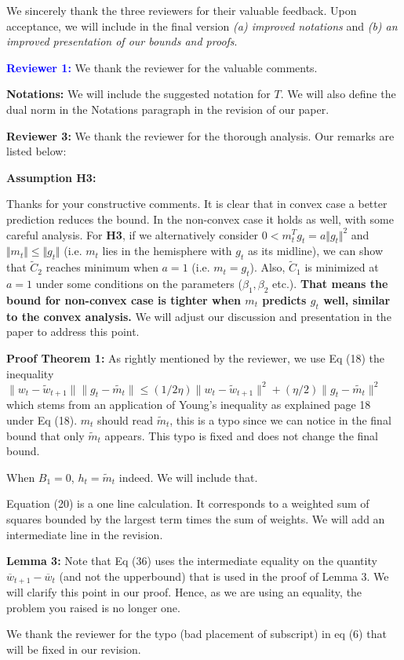 \documentclass{article}
\begin{document}
We sincerely thank the three reviewers for their valuable feedback. 
Upon acceptance, we will include in the final version \emph{{\sf (a)} improved notations} and \emph{{\sf (b)} an improved presentation of our bounds and proofs}. 


\vspace{0.05in}

\textbf{\textcolor{blue}{Reviewer 1:}} We thank the reviewer for the valuable comments.\vspace{-5pt}


\textbf{Notations:} 
We will include the suggested notation for $T$.
We will also define the dual norm in the Notations paragraph in the revision of our paper.

\vspace{0.05in}


\textbf{\textcolor{green!50!black}{Reviewer 3:}} We thank the reviewer for the thorough analysis. Our remarks are listed below:\vspace{-5pt}

\textbf{Assumption H3:}

Thanks for your constructive comments. It is clear that in convex case a better prediction reduces the bound. In the non-convex case it holds as well, with some careful analysis. For \textbf{H3}, if we alternatively consider $0<m_t^T g_t=a\Vert g_t\Vert^2$ and $\Vert m_t\Vert\leq \Vert g_t\Vert$ (i.e. $m_t$ lies in the hemisphere with $g_t$ as its midline), we can show that $\tilde C_2$ reaches minimum when $a=1$ (i.e. $m_t=g_t$). Also, $\tilde C_1$ is minimized at $a=1$ under some conditions on the parameters ($\beta_1,\beta_2$ etc.). \textbf{That means the bound for non-convex case is tighter when $m_t$ predicts $g_t$ well, similar to the convex analysis.} We will adjust our discussion and presentation in the paper to address this point. \vspace{-5pt}

\textbf{Proof Theorem 1:} As rightly mentioned by the reviewer, we use Eq (18) the inequality $\|w_t-\tilde{w}_{t+1}\|\|g_t-\tilde{m_t}\|\leq (1/2\eta)\|w_t-\tilde{w}_{t+1}\|^2+ (\eta/2)\|g_t-\tilde{m_t}\|^2$ which stems from an application of Young's inequality as explained page 18 under Eq (18). $m_t$ should read $\tilde{m}_t$, this is a typo since we can notice in the final bound that only $\tilde{m}_t$ appears. This typo is fixed and does not change the final bound.

When $B_1 = 0$, $h_t = \tilde{m}_t$ indeed. We will include that.

Equation (20) is a one line calculation. It corresponds to a weighted sum of squares bounded by the largest term times the sum of weights.
We will add an intermediate line in the revision.

\textbf{Lemma 3:}
Note that Eq (36) uses the intermediate equality on the quantity $\overline{w}_{t+1} - \overline{w}_t$ (and not the upperbound) that is used in the proof of Lemma 3. We will clarify this point in our proof.
Hence, as we are using an equality, the problem you raised is no longer one.


We thank the reviewer for the typo (bad placement of subscript) in eq (6) that will be fixed in our revision.
\end{document}
